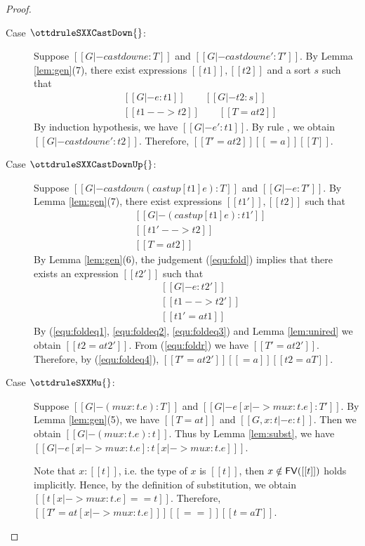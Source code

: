 \begin{proof}
\begin{description}
        \item[Case $\ottdruleSXXCastDown{}$:] $\quad$ \\
        Suppose $[[G |- castdown e :T]]$ and $[[G |- castdown e' :T']]$. By Lemma \ref{lem:gen}(7), there exist expressions $[[t1]], [[t2]]$ and a sort $s$ such that 
        \begin{align*}
            &[[G |- e:t1]] \qquad [[G |- t2:s]] \\
            &[[t1 --> t2]] \qquad [[T =a t2 ]]
        \end{align*}
        By induction hypothesis, we have $[[G |- e':t1]]$. By rule , we obtain $[[G |- castdown e' : t2 ]]$. Therefore, $[[T' =a t2]] [[=a]] [[T]]$.
        
        \item[Case $\ottdruleSXXCastDownUp{}$:] $\quad$ \\
        Suppose $[[G |- castdown (castup [t1] e) :T]]$ and $[[G |- e :T']]$. By Lemma \ref{lem:gen}(7), there exist expressions $[[t1']], [[t2]]$ such that 
        \begin{align}
            &[[G |- (castup [t1] e):t1']] \label{equ:fold} \\
            &[[t1' --> t2]] \label{equ:foldeq1} \\
            &[[T =a t2 ]] \label{equ:foldeq4}
        \end{align}
        By Lemma \ref{lem:gen}(6), the judgement (\ref{equ:fold}) implies that there exists an expression $[[t2']]$ such that
        \begin{align}
            &[[G |- e:t2']] \label{equ:foldr} \\
            &[[t1 --> t2']] \label{equ:foldeq2} \\
            &[[t1' =a t1]] \label{equ:foldeq3}
        \end{align}
        By (\ref{equ:foldeq1}, \ref{equ:foldeq2}, \ref{equ:foldeq3}) and Lemma \ref{lem:unired} we obtain $[[t2 =a t2']]$. From (\ref{equ:foldr}) we have $[[T' =a t2' ]]$. Therefore, by (\ref{equ:foldeq4}), $[[T' =a t2' ]] [[=a]] [[t2 =a T]]$.
        
        \item[Case $\ottdruleSXXMu{}$:] $\quad$ \\
        Suppose $[[G |- (mu x:t.e) :T]]$ and $[[G |- e[x |-> mu x:t.e] :T']]$. By Lemma \ref{lem:gen}(5), we have $[[T =a t]]$ and $[[G, x:t |- e:t]]$. Then we obtain $[[G |- (mu x:t.e) : t]]$. Thus by Lemma \ref{lem:subst}, we have $[[G |- e[x |-> mu x:t.e] : t[x |-> mu x:t.e] ]]$.
        
        Note that $x:[[t]]$, i.e. the type of $x$ is $[[t]]$, then $x \notin \mathsf{FV}([[t]])$ holds implicitly. Hence, by the definition of substitution, we obtain $[[t[x |-> mu x:t.e] == t]]$. Therefore, $[[T' =a t[x |-> mu x:t.e] ]] [[==]] [[t =a T]]$.
    \end{description}
\end{proof}

